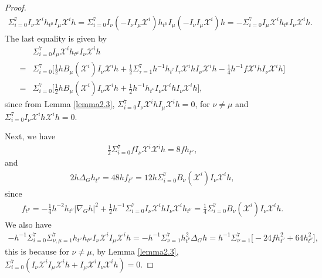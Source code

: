 \documentclass[reqno,12pt]{amsart}
\numberwithin{equation}{section}
\theoremstyle{plain}
\theoremstyle{definition}
\begin{document}
\begin{proof}
\begin{align*}
\Sigma_{i=0}^7I_\nu\mathscr{X}^i h_{t^\mu}I_\mu\mathscr{X}^i h=\Sigma_{i=0}^7 I_\nu(-I_\nu I_\mu\mathscr{X}^i) h_{t^\mu}I_\mu(-I_\nu I_\mu\mathscr{X}^i) h=-\Sigma_{i=0}^7I_\mu \mathscr{X}^i h_{t^\mu}I_\nu \mathscr{X}^i h.
\end{align*}
The last equality is given by
\begin{align*}
    &\Sigma_{i=0}^7I_\mu\mathscr{X}^i h_{t^\mu}I_\nu\mathscr{X}^ih\\=&\Sigma_{i=0}^7\bigg[\frac{1}{2}hB_\mu(\mathscr{X}^i)I_\nu\mathscr{X}^i h+\frac{1}{2}\Sigma_{\tau=1}^7h^{-1}h_{t^\tau}I_\tau \mathscr{X}^i hI_\nu\mathscr{X}^i h-\frac{1}{4}h^{-1}f\mathscr{X}^i h I_\nu\mathscr{X}^i h\bigg]\\=&\Sigma_{i=0}^7\bigg[\frac{1}{2}hB_\mu(\mathscr{X}^i)I_\nu\mathscr{X}^i h+\frac{1}{2}h^{-1}h_{t^\nu}I_\nu \mathscr{X}^i hI_\nu\mathscr{X}^i h\bigg],\end{align*}
since from Lemma \ref{lemma2.3}, $\Sigma_{i=0}^7I_\nu \mathscr{X}^i h I_\mu \mathscr{X}^i h=0$, for $\nu\neq \mu$ and $\Sigma_{i=0}^7I_\nu\mathscr{X}^i h\mathscr{X}^i h=0.$


Next, we have
\begin{align*}
    \frac{1}{2}\Sigma_{i=0}^7fI_\nu\mathscr{X}^i\mathscr{X}^i h=8fh_{t^\nu},
\end{align*}
and
\begin{align*}
    2h\Delta_G h_{t^\nu}=48 h f_{t^\nu}=12h\Sigma_{i=0}^7B_\nu(\mathscr{X}^i)I_\nu\mathscr{X}^i h,\end{align*}
    since
\begin{align}\label{ft}
    f_{t^\nu}=-\frac{1}{4}h^{-2}h_{t^\nu}|\nabla_G h|^2+\frac{1}{2}h^{-1}\Sigma_{i=0}^7  I_\nu\mathscr{X}^i h I_\nu\mathscr{X}^i h_{t^\nu}=\frac{1}{4}\Sigma_{i=0}^7B_\nu(\mathscr{X}^i)I_\nu\mathscr{X}^i h.
    \end{align}
We also have
\begin{align*}
    -h^{-1}\Sigma_{i=0}^7\Sigma_{\nu,\mu=1}^7h_{t^\nu}h_{t^\mu}I_\nu \mathscr{X}^i I_\mu\mathscr{X}^i h=-h^{-1}\Sigma_{\nu=1}^7h^2_{t^\nu}\Delta_G h=h^{-1}\Sigma_{\nu=1}^7\bigg[-24fh_{t^\nu}^2+64h_{t^\nu}^2\bigg],
    \end{align*}
this is because for $\nu\neq \mu$, by Lemma \ref{lemma2.3}, $\Sigma_{i=0}^7(I_\nu \mathscr{X}^iI_\mu \mathscr{X}^i h+I_\mu\mathscr{X}^iI_\nu\mathscr{X}^ih)=0.$


\end{proof}
\end{document}
